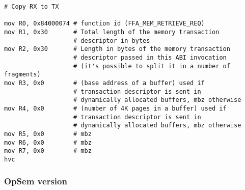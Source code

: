 \documentclass{article}
\begin{document}
\begin{lstlisting}[caption={VM 1}]
# Copy RX to TX

mov R0, 0x84000074 # function id (FFA_MEM_RETRIEVE_REQ)
mov R1, 0x30       # Total length of the memory transaction 
                   # descriptor in bytes
mov R2, 0x30       # Length in bytes of the memory transaction 
                   # descriptor passed in this ABI invocation
                   # (it's possible to split it in a number of fragments)
mov R3, 0x0        # (base address of a buffer) used if 
                   # transaction descriptor is sent in 
                   # dynamically allocated buffers, mbz otherwise
mov R4, 0x0        # (number of 4K pages in a buffer) used if 
                   # transaction descriptor is sent in 
                   # dynamically allocated buffers, mbz otherwise
mov R5, 0x0        # mbz
mov R6, 0x0        # mbz
mov R7, 0x0        # mbz
hvc
\end{lstlisting}

\subsubsection{OpSem version}
\end{document}

